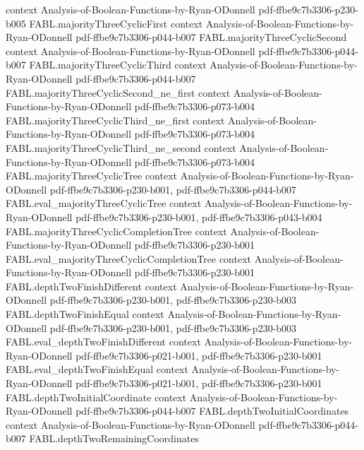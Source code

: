 \begin{theorem}
  {context}
  {Analysis-of-Boolean-Functions-by-Ryan-ODonnell}
  {pdf-ffbe9c7b3306-p230-b005}
\proofstep
  {FABL.majorityThreeCyclicFirst}
  {context}
  {Analysis-of-Boolean-Functions-by-Ryan-ODonnell}
  {pdf-ffbe9c7b3306-p044-b007}
\proofstep
  {FABL.majorityThreeCyclicSecond}
  {context}
  {Analysis-of-Boolean-Functions-by-Ryan-ODonnell}
  {pdf-ffbe9c7b3306-p044-b007}
\proofstep
  {FABL.majorityThreeCyclicThird}
  {context}
  {Analysis-of-Boolean-Functions-by-Ryan-ODonnell}
  {pdf-ffbe9c7b3306-p044-b007}
\proofstep
  {FABL.majorityThreeCyclicSecond_ne_first}
  {context}
  {Analysis-of-Boolean-Functions-by-Ryan-ODonnell}
  {pdf-ffbe9c7b3306-p073-b004}
\proofstep
  {FABL.majorityThreeCyclicThird_ne_first}
  {context}
  {Analysis-of-Boolean-Functions-by-Ryan-ODonnell}
  {pdf-ffbe9c7b3306-p073-b004}
\proofstep
  {FABL.majorityThreeCyclicThird_ne_second}
  {context}
  {Analysis-of-Boolean-Functions-by-Ryan-ODonnell}
  {pdf-ffbe9c7b3306-p073-b004}
\proofstep
  {FABL.majorityThreeCyclicTree}
  {context}
  {Analysis-of-Boolean-Functions-by-Ryan-ODonnell}
  {pdf-ffbe9c7b3306-p230-b001,
    pdf-ffbe9c7b3306-p044-b007}
\proofstep
  {FABL.eval_majorityThreeCyclicTree}
  {context}
  {Analysis-of-Boolean-Functions-by-Ryan-ODonnell}
  {pdf-ffbe9c7b3306-p230-b001,
    pdf-ffbe9c7b3306-p043-b004}
\proofstep
  {FABL.majorityThreeCyclicCompletionTree}
  {context}
  {Analysis-of-Boolean-Functions-by-Ryan-ODonnell}
  {pdf-ffbe9c7b3306-p230-b001}
\proofstep
  {FABL.eval_majorityThreeCyclicCompletionTree}
  {context}
  {Analysis-of-Boolean-Functions-by-Ryan-ODonnell}
  {pdf-ffbe9c7b3306-p230-b001}
\proofstep
  {FABL.depthTwoFinishDifferent}
  {context}
  {Analysis-of-Boolean-Functions-by-Ryan-ODonnell}
  {pdf-ffbe9c7b3306-p230-b001,
    pdf-ffbe9c7b3306-p230-b003}
\proofstep
  {FABL.depthTwoFinishEqual}
  {context}
  {Analysis-of-Boolean-Functions-by-Ryan-ODonnell}
  {pdf-ffbe9c7b3306-p230-b001,
    pdf-ffbe9c7b3306-p230-b003}
\proofstep
  {FABL.eval_depthTwoFinishDifferent}
  {context}
  {Analysis-of-Boolean-Functions-by-Ryan-ODonnell}
  {pdf-ffbe9c7b3306-p021-b001,
    pdf-ffbe9c7b3306-p230-b001}
\proofstep
  {FABL.eval_depthTwoFinishEqual}
  {context}
  {Analysis-of-Boolean-Functions-by-Ryan-ODonnell}
  {pdf-ffbe9c7b3306-p021-b001,
    pdf-ffbe9c7b3306-p230-b001}
\proofstep
  {FABL.depthTwoInitialCoordinate}
  {context}
  {Analysis-of-Boolean-Functions-by-Ryan-ODonnell}
  {pdf-ffbe9c7b3306-p044-b007}
\proofstep
  {FABL.depthTwoInitialCoordinates}
  {context}
  {Analysis-of-Boolean-Functions-by-Ryan-ODonnell}
  {pdf-ffbe9c7b3306-p044-b007}
\proofstep
  {FABL.depthTwoRemainingCoordinates}

\end{theorem}
